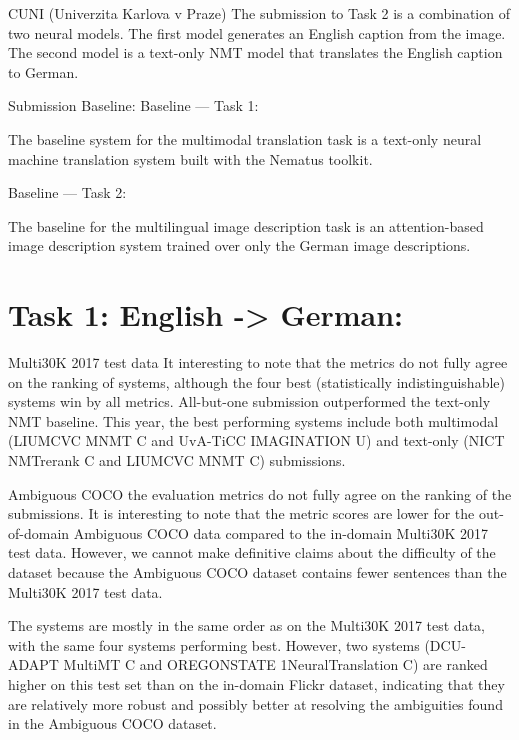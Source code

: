 \documentclass[presentation]{beamer}
\begin{document}
\begin{frame}[label={sec:orge8780f2}]{CUNI (Univerzita Karlova v Praze)}
The submission to Task 2 is a combination of two neural models. The first model generates an English caption from the image. The second model is a text-only NMT model that translates the English caption to German.
\end{frame}


\begin{frame}[label={sec:org453ee45}]{Submission Baseline:}
Baseline — Task 1:

The baseline system for the multimodal translation task is a text-only neural machine translation system built with the Nematus toolkit.

Baseline — Task 2:

The baseline for the multilingual image description task is an attention-based image description system trained over only the German image descriptions.
\end{frame}


\section{Task 1: English -> German:}
\label{sec:org2a316c2}

\begin{frame}[label={sec:org9e2092d}]{Multi30K 2017 test data}
It interesting to note that the metrics do not fully agree on the ranking of systems, although the four best (statistically indistinguishable) systems win by all metrics. All-but-one submission outperformed the text-only NMT baseline. This year, the best performing systems include both multimodal (LIUMCVC MNMT C and UvA-TiCC IMAGINATION U) and text-only (NICT NMTrerank C and LIUMCVC MNMT C) submissions.
\end{frame}


\begin{frame}[label={sec:org8953f22}]{Ambiguous COCO}
the evaluation metrics do not fully agree on the ranking of the submissions. It is interesting to note that the metric scores are lower for the out-of-domain Ambiguous COCO data compared to the in-domain Multi30K 2017 test data. However, we cannot make definitive claims about the difficulty of the dataset because the Ambiguous COCO dataset contains fewer sentences than the Multi30K 2017 test data.

The systems are mostly in the same order as on the Multi30K 2017 test data, with the same four systems performing best. However, two systems (DCU-ADAPT MultiMT C and OREGONSTATE 1NeuralTranslation C) are ranked higher on this test set than on the in-domain Flickr dataset, indicating that they are relatively more robust and possibly better at resolving the ambiguities found in the Ambiguous COCO dataset.
\end{frame}
\end{document}
